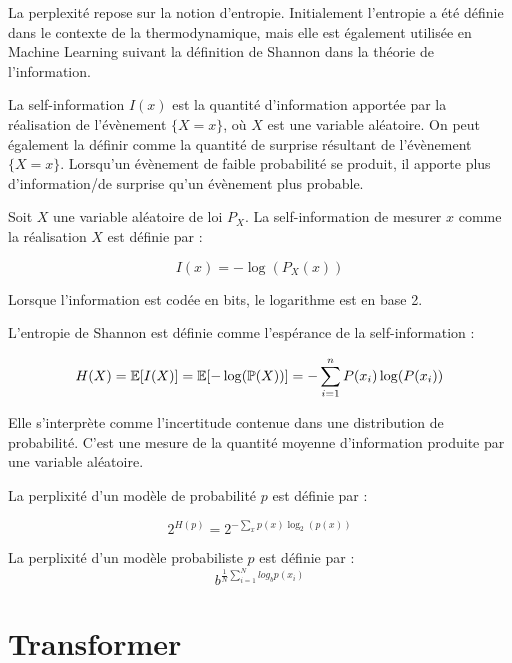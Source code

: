 La perplexité repose sur la notion d’entropie.
Initialement l’entropie a été définie dans le contexte de la thermodynamique, 
mais elle est également utilisée en Machine Learning suivant la 
définition de Shannon dans la théorie de l’information.

La self-information $I(x)$ est la quantité d’information apportée par la réalisation de 
l’évènement $\{X=x\}$, où $X$ est une variable aléatoire. On peut également la définir 
comme la quantité de \og surprise \fg{} résultant de l’évènement $\{X=x\}$. Lorsqu’un évènement de 
faible probabilité se produit, il apporte plus d’information/de surprise 
qu’un évènement plus probable.

\begin{definition}

  Soit $X$ une variable aléatoire de loi $P_X$. La self-information de mesurer $x$
  comme la réalisation $X$ est définie par :

  \[ I(x) = - \log\left(P_X(x)\right) \]

\end{definition}

Lorsque l'information est codée en bits, le logarithme est en base 2.

\begin{definition}
L'entropie de Shannon est définie comme l'espérance de la self-information :

  \[ H(X) = \mathbb{E}[I(X)] = \mathbb{E}[-\log(\mathbb{P}(X))] = - \sum_{i=1}^{n} P(x_i)\log(P(x_i)) \]
\end{definition}

Elle s'interprète comme l'incertitude contenue dans une distribution de probabilité.
C'est une mesure de la quantité moyenne d'information produite par une
variable aléatoire.

\begin{definition}
La perplixité d'un modèle de probabilité $p$ est définie par :

  \[ 2^{H(p)} = 2^{- \sum_{x}^{} p(x) \log_2(p(x))} \]
\end{definition}

\begin{definition}
La perplixité d'un modèle probabiliste $p$ est définie par :
  \[ b^{ \frac{1}{N} \sum_{i=1}^{N}  log_b p(x_i)} \]
\end{definition}

\newpage

\section{Transformer}

